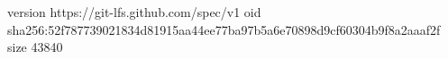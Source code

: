 version https://git-lfs.github.com/spec/v1
oid sha256:52f787739021834d81915aa44ee77ba97b5a6e70898d9cf60304b9f8a2aaaf2f
size 43840
